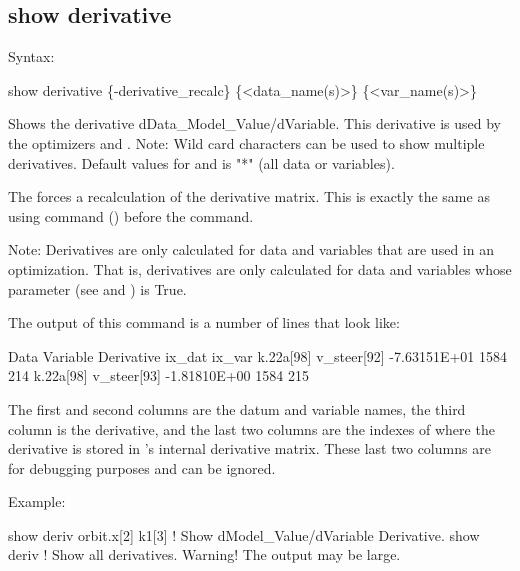 {{{{{{{{{%

\subsection{show derivative}
\label{s:show.derivative}

Syntax:
\begin{example}
  show derivative \{-derivative_recalc\} \{<data_name(s)>\} \{<var_name(s)>\}
\end{example}

Shows the derivative dData_Model_Value/dVariable. This derivative is used by the optimizers 
and . Note: Wild card characters can be used to show multiple derivatives.  Default values
for  and  is "*" (all data or variables).

The  forces a recalculation of the derivative matrix. This is exactly the
same as using  command () before the  command.

Note: Derivatives are only calculated for data and variables that are used in an optimization. That
is, derivatives are only calculated for data and variables whose  parameter (see
 and ) is True.

The output of this command is a number of lines that look like:
\begin{example}
  Data                Variable               Derivative   ix_dat  ix_var
  k.22a[98]           v_steer[92]           -7.63151E+01    1584     214
  k.22a[98]           v_steer[93]           -1.81810E+00    1584     215
\end{example}
The first and second columns are the datum and variable names, the third column is the derivative,
and the last two columns are the indexes of where the derivative is stored in \tao's internal
derivative matrix. These last two columns are for debugging purposes and can be ignored.

Example:
\begin{example}
  show deriv orbit.x[2] k1[3] ! Show dModel_Value/dVariable Derivative.
  show deriv                  ! Show all derivatives. Warning! The output may be large.

\end{example}


}}}}}}}}}
